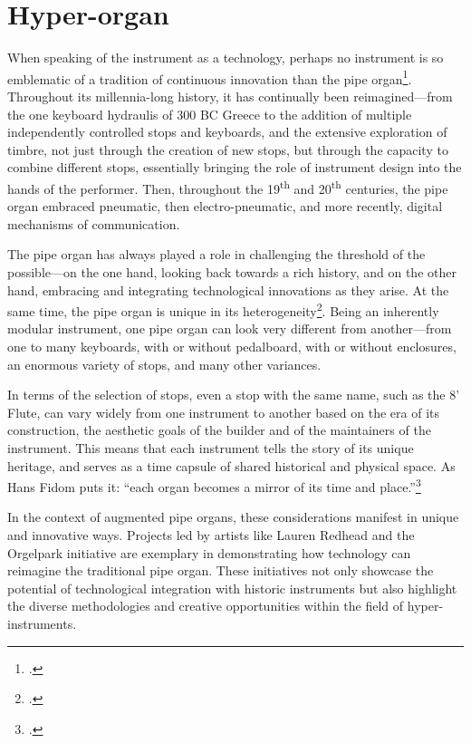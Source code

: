 \documentclass[12pt,twoside,maitrise]{dms_ks}
\theoremstyle{definition}
\begin{document}
{\section{Hyper-organ}

When speaking of the instrument as a technology, perhaps no instrument is so emblematic of a tradition of continuous innovation than the pipe organ\footcite[35]{peters_how_2014}. 
Throughout its millennia-long history, it has continually been reimagined---from the one keyboard hydraulis of 300 BC Greece to the addition of multiple independently controlled stops and keyboards, and the extensive exploration of timbre, not just through the creation of new stops, but through the capacity to combine different stops, essentially bringing the role of instrument design into the hands of the performer. 
Then, throughout the 19\textsuperscript{th} and 20\textsuperscript{th} centuries, the pipe organ embraced pneumatic, then electro-pneumatic, and more recently, digital mechanisms of communication. 

The pipe organ has always played a role in challenging the threshold of the possible---on the one hand, looking back towards a rich history, and on the other hand, embracing and integrating technological innovations as they arise. 
At the same time, the pipe organ is unique in its heterogeneity\footcite[344--345]{redhead_developing_2023}. 
Being an inherently modular instrument, one pipe organ can look very different from another---from one to many keyboards, with or without pedalboard, with or without enclosures, an enormous variety of stops, and many other variances. 

In terms of the selection of stops, even a stop with the same name, such as the 8' Flute, can vary widely from one instrument to another based on the era of its construction, the aesthetic goals of the builder and of the maintainers of the instrument. 
This means that each instrument tells the story of its unique heritage, and serves as a time capsule of shared historical and physical space.
As Hans Fidom puts it: “each organ becomes a mirror of its time and place.”\footcite[18]{fidom_digital_2014}

In the context of augmented pipe organs, these considerations manifest in unique and innovative ways.
Projects led by artists like Lauren Redhead and the Orgelpark initiative are exemplary in demonstrating how technology can reimagine the traditional pipe organ.
These initiatives not only showcase the potential of technological integration with historic instruments but also highlight the diverse methodologies and creative opportunities within the field of hyper-instruments.

}
\end{document}
